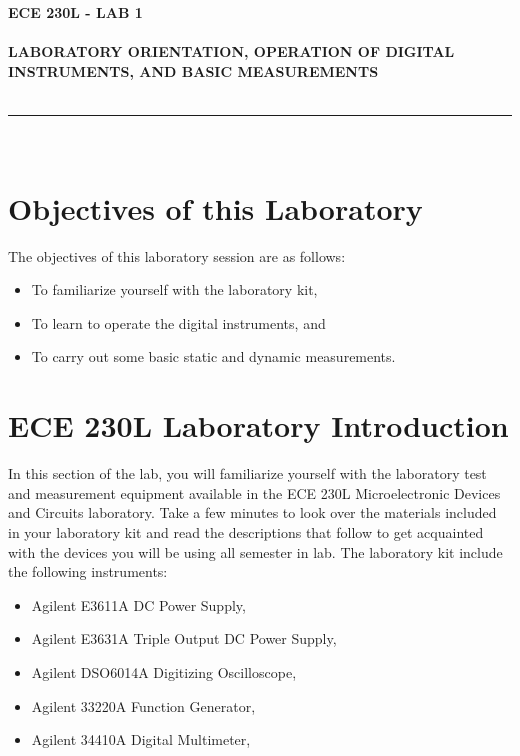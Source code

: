 \documentclass[12pt]{../manual}
\begin{document}
\begin{center}
\textbf{\huge ECE 230L - LAB 1}\\~\\
\textbf{\large LABORATORY ORIENTATION, OPERATION OF DIGITAL INSTRUMENTS, AND BASIC MEASUREMENTS }\\~\\
\rule{6.5in}{0.5mm}\\
\end{center}

\tableofcontents

\listoffigures

\newpage
%
\section{Objectives of this Laboratory}
The objectives of this laboratory session are as follows:
\begin{itemize}
\item To familiarize yourself with the laboratory kit, 
\item To learn to operate the digital instruments, and 
\item To carry out some basic static and dynamic measurements. 
\end{itemize}

\section{ECE 230L Laboratory Introduction}
In this section of the lab, you will familiarize yourself with the laboratory test and measurement equipment available in the ECE 230L Microelectronic Devices and Circuits laboratory.  Take a few minutes to look over the materials included in your laboratory kit and read the descriptions that follow to get acquainted with the devices you will be using all semester in lab. The laboratory kit include the following instruments:
\begin{itemize}
\item Agilent E3611A DC Power Supply, 
\item Agilent E3631A Triple Output DC Power Supply, 
\item Agilent DSO6014A Digitizing Oscilloscope, 
\item Agilent 33220A Function Generator, 
\item Agilent 34410A Digital Multimeter, 
\end{itemize}
\end{document}
